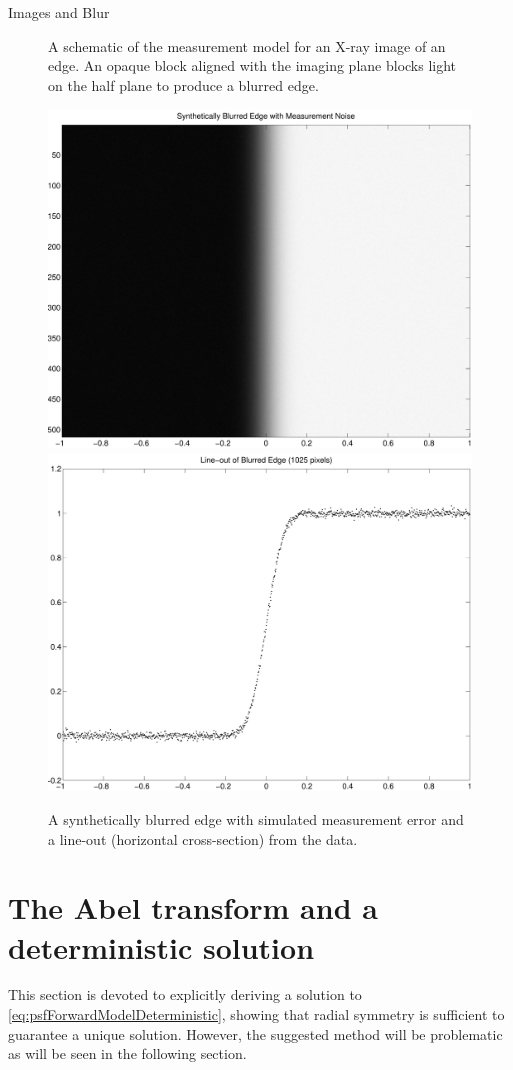\begin{chapter}{Images and Blur}
\begin{figure}
\begin{center}
\begin{tikzpicture}[scale=.8,every node/.style={minimum size=1cm},on grid]
    \end{tikzpicture}
  \caption{ A schematic of the measurement model for an X-ray image of an edge. An opaque block aligned with the imaging plane blocks light on the half plane to produce a blurred edge.}\label{fig:edgePicture}
\end{center}
\end{figure}

\begin{figure}
\begin{center}
  \includegraphics[width=.45\textwidth]{figures/blurredEdgeData.pdf}
  \includegraphics[width=.45\textwidth]{figures/psfLineoutData.pdf}
  \caption{A synthetically blurred edge with simulated measurement error and a line-out (horizontal cross-section) from the data.} \label{fig:edgeData}
\end{center}
\end{figure}
  
\section{The Abel transform and a deterministic solution}

  This section is devoted to explicitly deriving a solution to \eqref{eq:psfForwardModelDeterministic}, showing that radial symmetry is sufficient to guarantee a unique solution.
  However, the suggested method will be problematic as will be seen in the following section.


\end{chapter}
